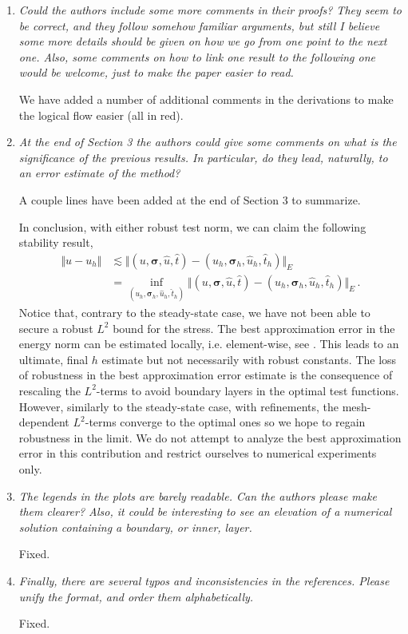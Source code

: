 \documentclass[11pt,c]{article}
\theoremstyle{remark}
\newcommand{\bfsigma}{\boldsymbol\sigma}
\begin{document}
\begin{enumerate}
  \item {\em Could the authors include some more comments in their proofs? They seem to be correct,
and they follow somehow familiar arguments, but still I believe some more details should
be given on how we go from one point to the next one. Also, some comments on how to
link one result to the following one would be welcome, just to make the paper easier
to read.}

We have added a number of additional comments in the derivations to make the logical
flow easier (all in red).

  \item {\em At the end of Section 3 the authors could give some comments on what is the significance
of the previous results. In particular, do they lead, naturally, to an error estimate of the method?}

A couple lines have been  added at the end of Section 3 to summarize.

In conclusion, with either robust test norm, we can claim the following stability result,
$$
\begin{array}{ll}
\Vert u - u_h \Vert & \lesssim \Vert (u,\bfsigma,\hat{u},\hat{t}) - (u_h,\bfsigma_h,\hat{u}_h,\hat{t}_h) \Vert_E \\[8pt]
& = \inf_{(u_h,\bfsigma_h,\hat{u}_h,\hat{t}_h)} \Vert (u,\bfsigma,\hat{u},\hat{t}) - (u_h,\bfsigma_h,\hat{u}_h,\hat{t}_h) \Vert_E \, .
\end{array}
$$
Notice that, contrary to the steady-state case, we have not been able to secure a robust $L^2$ bound
for the stress. The best approximation error in the energy norm can be estimated locally, i.e.
element-wise, see \cite{DemkowiczHeuer,ChanHeuerThanhDemkowicz2012}. This leads to an ultimate, final $h$ estimate but
not necessarily with robust constants. The loss of robustness in the best approximation error
estimate is the consequence of rescaling the $L^2$-terms to avoid boundary layers in the optimal
test functions. However, similarly to the steady-state case, with refinements, the mesh-dependent
$L^2$-terms converge to the optimal ones so we hope to regain robustness in the limit. 
We do not attempt to analyze the best approximation error in this contribution and restrict
ourselves to numerical experiments only.








  \item {\em The legends in the plots are barely readable. Can the authors please make them clearer?
Also, it could be interesting to see an elevation of a numerical solution containing a boundary,
or inner, layer.}

Fixed.

  \item{\em Finally, there are several typos and inconsistencies in the references. Please unify the format,
and order them alphabetically.}

Fixed.

\end{enumerate}


 

\end{document}
